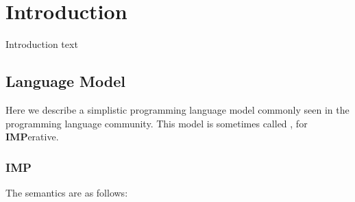 \section{Introduction}
Introduction text

\subsection*{Language Model}
Here we describe a simplistic programming language model commonly seen
in the programming language community.
This model is sometimes called \imp{}, for \textbf{IMP}erative.

\subsubsection*{IMP}

The semantics are as follows:


